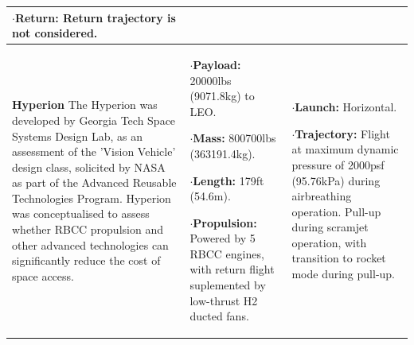 {\begin{landscape}
\begin{xltabular}{\linewidth}{|X|X|X|}
$\cdot$\textbf{Return:} Return trajectory is not considered. \\

\hline \small\textbf{Hyperion}\cite{Hyperion}\newline \newline 
The Hyperion was developed by Georgia Tech Space Systems Design Lab, as an assessment of the 'Vision Vehicle' design class, solicited by NASA as part of the Advanced Reusable Technologies Program. Hyperion was conceptualised to assess whether RBCC propulsion and other advanced technologies can significantly reduce the cost of space access. 
&\small {}  

$\cdot$\textbf{Payload:} 20000lbs (9071.8kg) to LEO. 

$\cdot$\textbf{Mass:} 800700lbs (363191.4kg).

$\cdot$\textbf{Length:} 179ft (54.6m). 



$\cdot$\textbf{Propulsion:} Powered by 5 RBCC engines, with return flight suplemented by low-thrust H2 ducted fans. 

&\small {} 

$\cdot$\textbf{Launch:} Horizontal.

$\cdot$\textbf{Trajectory:} Flight at maximum dynamic pressure of 2000psf (95.76kPa) during airbreathing operation. Pull-up during scramjet operation, with transition to rocket mode during pull-up. 


\end{xltabular}
\end{landscape}}
